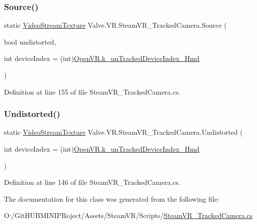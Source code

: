 \subsubsection{\texorpdfstring{Source()}{Source()}}
{\footnotesize\ttfamily static \mbox{\hyperlink{class_valve_1_1_v_r_1_1_steam_v_r___tracked_camera_1_1_video_stream_texture}{Video\+Stream\+Texture}} Valve.\+V\+R.\+Steam\+V\+R\+\_\+\+Tracked\+Camera.\+Source (\begin{DoxyParamCaption}\item[{bool}]{undistorted,  }\item[{int}]{device\+Index = {\ttfamily (int)\mbox{\hyperlink{class_valve_1_1_v_r_1_1_open_v_r_ae12d105c6f832aa4524e2608b26896e0}{Open\+V\+R.\+k\+\_\+un\+Tracked\+Device\+Index\+\_\+\+Hmd}}} }\end{DoxyParamCaption})\hspace{0.3cm}{\ttfamily [static]}}



Definition at line 155 of file Steam\+V\+R\+\_\+\+Tracked\+Camera.\+cs.

\mbox{\label{class_valve_1_1_v_r_1_1_steam_v_r___tracked_camera_aa00f26ee2d0be48d102d08fcca88f238}} 
\subsubsection{\texorpdfstring{Undistorted()}{Undistorted()}}
{\footnotesize\ttfamily static \mbox{\hyperlink{class_valve_1_1_v_r_1_1_steam_v_r___tracked_camera_1_1_video_stream_texture}{Video\+Stream\+Texture}} Valve.\+V\+R.\+Steam\+V\+R\+\_\+\+Tracked\+Camera.\+Undistorted (\begin{DoxyParamCaption}\item[{int}]{device\+Index = {\ttfamily (int)\mbox{\hyperlink{class_valve_1_1_v_r_1_1_open_v_r_ae12d105c6f832aa4524e2608b26896e0}{Open\+V\+R.\+k\+\_\+un\+Tracked\+Device\+Index\+\_\+\+Hmd}}} }\end{DoxyParamCaption})\hspace{0.3cm}{\ttfamily [static]}}



Definition at line 146 of file Steam\+V\+R\+\_\+\+Tracked\+Camera.\+cs.



The documentation for this class was generated from the following file\+:\begin{DoxyCompactItemize}
\item 
O\+:/\+Git\+H\+U\+B\+M\+I\+N\+I\+P\+Roject/\+Assets/\+Steam\+V\+R/\+Scripts/\mbox{\hyperlink{_steam_v_r___tracked_camera_8cs}{Steam\+V\+R\+\_\+\+Tracked\+Camera.\+cs}}\end{DoxyCompactItemize}
